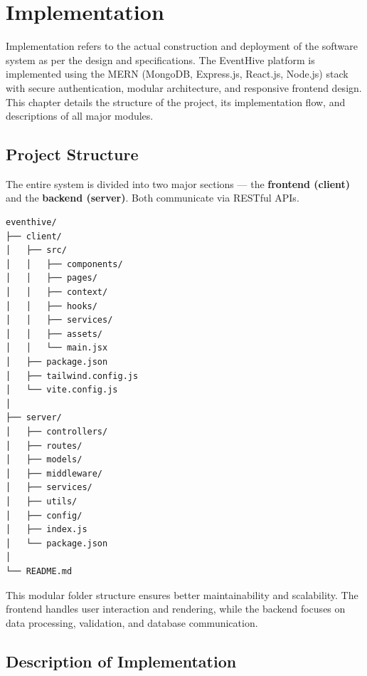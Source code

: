 \documentclass[12pt,a4paper]{report}
\begin{document}
\chapter{Implementation}

Implementation refers to the actual construction and deployment of the software system as per the design and specifications. The EventHive platform is implemented using the MERN (MongoDB, Express.js, React.js, Node.js) stack with secure authentication, modular architecture, and responsive frontend design. This chapter details the structure of the project, its implementation flow, and descriptions of all major modules.

\section{Project Structure}

The entire system is divided into two major sections — the \textbf{frontend (client)} and the \textbf{backend (server)}. Both communicate via RESTful APIs.

\begin{verbatim}
eventhive/
├── client/
│   ├── src/
│   │   ├── components/
│   │   ├── pages/
│   │   ├── context/
│   │   ├── hooks/
│   │   ├── services/
│   │   ├── assets/
│   │   └── main.jsx
│   ├── package.json
│   ├── tailwind.config.js
│   └── vite.config.js
│
├── server/
│   ├── controllers/
│   ├── routes/
│   ├── models/
│   ├── middleware/
│   ├── services/
│   ├── utils/
│   ├── config/
│   ├── index.js
│   └── package.json
│
└── README.md
\end{verbatim}

\noindent
This modular folder structure ensures better maintainability and scalability. The frontend handles user interaction and rendering, while the backend focuses on data processing, validation, and database communication.

\section{Description of Implementation}
\end{document}
